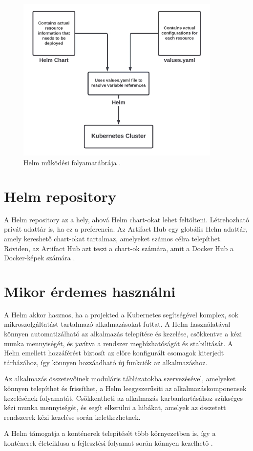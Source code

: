 \begin{figure}[ht]
    \centering
         \includegraphics[width=0.9\textwidth]{figures/helm/helm-overview.png}
          \caption{Helm működési folyamatábrája \cite{helm}.}
           \label{helm-overview}
\end{figure}

\section{Helm repository}
A Helm repository az a hely, ahová Helm chart-okat lehet feltölteni.
Létrehozható privát adattár is, ha ez a preferencia.
Az Artifact Hub egy globális Helm adattár, amely kereshető chart-okat tartalmaz, amelyeket számos célra telepíthet.
Röviden, az Artifact Hub azt teszi a chart-ok számára, amit a Docker Hub a Docker-képek számára \cite{helm}.

\section{Mikor érdemes használni}
A Helm akkor hasznos, ha a projekted a Kubernetes segítségével komplex, sok mikroszolgáltatást tartalmazó alkalmazásokat futtat.
A Helm használatával könnyen automatizálható az alkalmazás telepítése és kezelése, csökkentve a kézi munka mennyiségét, és javítva a rendszer megbízhatóságát és stabilitását.
A Helm emellett hozzáférést biztosít az előre konfigurált csomagok kiterjedt tárházához, így könnyen hozzáadható új funkciók az alkalmazáshoz.

Az alkalmazás összetevőinek moduláris táblázatokba szervezésével, amelyeket könnyen telepíthet és frissíthet, a Helm leegyszerűsíti az alkalmazáskomponensek kezelésének folyamatát.
Csökkentheti az alkalmazás karbantartásához szükséges kézi munka mennyiségét, és segít elkerülni a hibákat, amelyek az összetett rendszerek kézi kezelése során keletkezhetnek.

A Helm támogatja a konténerek telepítését több környezetben is, így a konténerek életciklusa a fejlesztési folyamat során könnyen kezelhető \cite{helm}.
